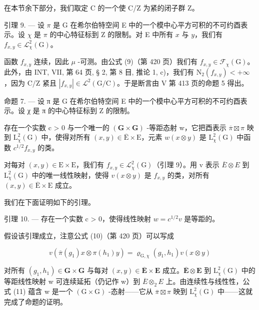 在本节余下部分，我们取定 C 的一个使 C/Z 为紧的闭子群 Z。

引理 9. --- 设 \(\pi\) 是 G 在希尔伯特空间 E 中的一个模中心平方可积的不可约酉表示。设 \(\chi\) 是 \(\pi\) 的中心特征标到 Z 的限制。对 E 中所有 \(x\) 与 \(y\)，我们有 \(f_{x,y} \in \mathcal{L}_{\chi}^{2}(\mathrm{G})\)。

 函数 \(f_{x,y}\) 连续，因此 \(\mu\) -可测。由公式 (9)（第 420 页）我们有 \(f_{x,y} \in \mathcal{F}_{\chi}(\mathrm{G})\)。此外，由 INT, VII, 第 64 页, § 2, 第 8 目, 推论 1, c)，我们有 \(\mathrm{N}_{2}(f_{x,y}) < +\infty\)，因为 C/Z 紧且 \(|f_{x,y}| \in \mathcal{L}^{2}(\mathrm{G}/\mathrm{C})\)。于是断言由 V 第 413 页的命题 5 得出。

命题 7. --- 设 π 是 G 在希尔伯特空间 E 中的一个模中心平方可积的不可约酉表示。设 χ 是 π 的中心特征标到 Z 的限制。

存在一个实数 c \textgreater{} 0 与一个唯一的 \((\mathbf{G} \times \mathbf{G})\) -等距态射 w，它把酉表示 \(\overline{\pi} \boxtimes \pi\) 映到 \(\mathrm{L}_{\chi}^{2}(\mathrm{G})\) 中，使得对所有 \((x, y) \in \overline{\mathrm{E}} \times \mathrm{E}\)，元素 \(w(x \otimes y)\) 是 \(\mathrm{L}_{\chi}^{2}(\mathrm{G})\) 中函数 \(c^{1/2} f_{x,y}\) 的类。

 对每对 \((x,y)\in\mathrm{E}\times\mathrm{E}\)，我们有 \(f_{x,y}\in\mathcal{L}_{\chi}^{2}(\mathrm{G})\)（引理 9）。用 v 表示 \(\overline{E}\otimes E\) 到 \(\mathrm{L}_{\chi}^{2}(\mathrm{G})\) 中的唯一线性映射，使得 \(v(x\otimes y)\) 是 \(f_{x,y}\) 的类，对所有 \((x,y)\in\overline{\mathrm{E}}\times\mathrm{E}\) 成立。

我们在下面证明如下的引理。

引理 10. --- 存在一个实数 c \textgreater{} 0，使得线性映射 \(w = c^{1/2}v\) 是等距的。

假设该引理成立，注意公式 (10)（第 420 页）可以写成

\[
v (\overline {{\pi}} (g _ {1}) x \otimes \pi (h _ {1}) y) = \varrho_ {\mathrm{G}, \chi} (g _ {1}, h _ {1}) v (x \otimes y)\tag{11}
\]

 对所有 \((g_{1}, h_{1}) \in \mathbf{G} \times \mathbf{G}\) 与每对 \((x, y) \in \overline{\mathbf{E}} \times \mathbf{E}\) 成立。\(\overline{\mathbf{E}} \otimes \mathbf{E}\) 到 \(\mathrm{L}_{\chi}^{2}(\mathrm{G})\) 中的等距线性映射 w 可连续延拓（仍记作 w）到 \(\overline{E} \widehat{\otimes}_{2} E\) 上。由连续性与线性性，公式 (11) 蕴含 w 是一个 \((\mathrm{G} \times \mathrm{G})\) -态射——它从 \(\overline{\pi} \boxtimes \pi\) 映到 \(\mathrm{L}_{\chi}^{2}(\mathrm{G})\) 中——这就完成了命题的证明。

